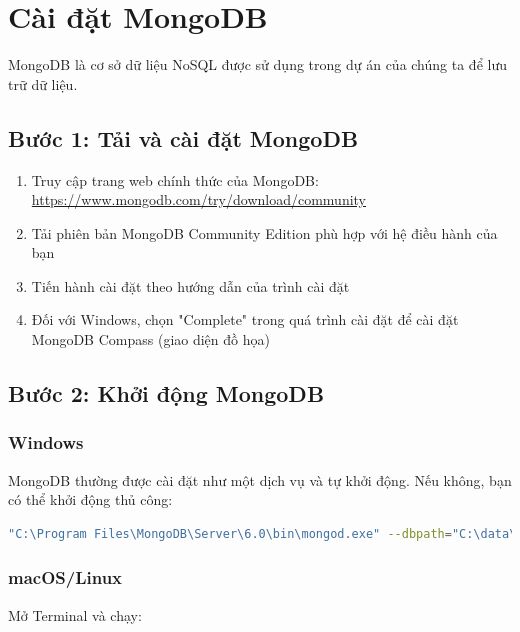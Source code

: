 
\section{Cài đặt MongoDB}

MongoDB là cơ sở dữ liệu NoSQL được sử dụng trong dự án của chúng ta để lưu trữ dữ liệu.

\subsection{Bước 1: Tải và cài đặt MongoDB}

\begin{enumerate}
    \item Truy cập trang web chính thức của MongoDB: \url{https://www.mongodb.com/try/download/community}
    \item Tải phiên bản MongoDB Community Edition phù hợp với hệ điều hành của bạn
    \item Tiến hành cài đặt theo hướng dẫn của trình cài đặt
    \item Đối với Windows, chọn "Complete" trong quá trình cài đặt để cài đặt MongoDB Compass (giao diện đồ họa)
\end{enumerate}

\subsection{Bước 2: Khởi động MongoDB}

\subsubsection{Windows}
MongoDB thường được cài đặt như một dịch vụ và tự khởi động. Nếu không, bạn có thể khởi động thủ công:

\begin{lstlisting}[language=bash]
"C:\Program Files\MongoDB\Server\6.0\bin\mongod.exe" --dbpath="C:\data\db"
\end{lstlisting}

\subsubsection{macOS/Linux}
Mở Terminal và chạy:

